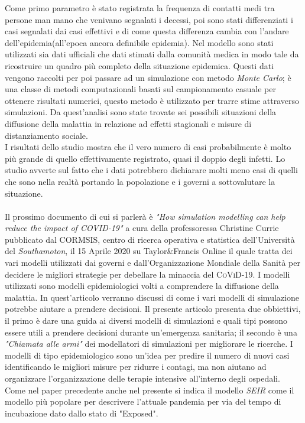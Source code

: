 \documentclass[12pt, openany]{book}
\begin{document}
		Come primo parametro è stato registrata la frequenza di contatti medi tra persone man mano che venivano segnalati i decessi, poi sono stati differenziati i casi segnalati dai casi effettivi e di come questa differenza cambia con l'andare dell'epidemia(all'epoca ancora definibile epidemia). Nel modello sono stati utilizzati sia dati ufficiali che dati stimati dalla comunità medica in modo tale da ricostruire un quadro più completo della situazione epidemica. Questi dati vengono raccolti per poi passare ad un simulazione con metodo \emph{Monte Carlo}; è una classe di metodi computazionali basati sul campionamento casuale per ottenere risultati numerici, questo metodo è utilizzato per trarre stime attraverso simulazioni.
		Da quest'analisi sono state trovate sei possibili situazioni della diffusione della malattia in relazione ad effetti stagionali e misure di distanziamento sociale.\\
		I risultati dello studio mostra che il vero numero di casi probabilmente è molto più grande di quello effettivamente registrato, quasi il doppio degli infetti. Lo studio avverte sul fatto che i dati potrebbero dichiarare molti meno casi di quelli che sono nella realtà portando la popolazione e i governi a sottovalutare la situazione.
		\\
		\\
		Il prossimo documento di cui si parlerà è  \emph{"How simulation modelling can help reduce the impact of COVID-19"} \cite{Simulazioni} a cura della professoressa Christine Currie pubblicato dal \textsc{CORMSIS}, centro di ricerca operativa e statistica dell'Università del \emph{Southamoton}, il 15 Aprile 2020 su Taylor\&Francis Online il quale tratta dei vari modelli utilizzati dai governi e dall'Organizzazione Mondiale della Sanità per decidere le migliori strategie per debellare la minaccia del \textsc{CoViD-19}. I modelli utilizzati sono modelli epidemiologici volti a comprendere la diffusione della malattia. In quest'articolo verranno discussi di come i vari modelli di simulazione potrebbe aiutare a prendere decisioni.
		Il presente articolo presenta due obbiettivi, il primo è dare una guida ai diversi modelli di simulazioni e quali tipi possono essere utili a prendere decisioni durante un'emergenza sanitaria; il secondo è una \emph{"Chiamata alle armi"} dei modellatori di simulazioni per migliorare le ricerche.
		I modelli di tipo epidemiologico sono un'idea per predire il numero di nuovi casi identificando le migliori misure per ridurre i contagi, ma non aiutano ad organizzare l'organizzazione delle terapie intensive all'interno degli ospedali. Come nel paper precedente anche nel presente si indica il modello \emph{SEIR} come il modello più popolare per descrivere l'attuale pandemia per via del tempo di incubazione dato dallo stato di "Exposed".\\
\end{document}

